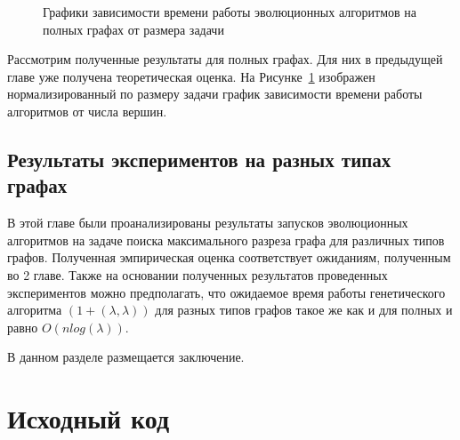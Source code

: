 \documentclass[times]{itmo-student-thesis}
\newcommand{\alglambda}{${(1 + (\lambda , \lambda))}$\xspace}
\newcommand{\ollga}{${(1 + (\lambda , \lambda))}$-ГА\xspace}
\begin{document}
\begin{figure}[t!]
\caption{Графики зависимости времени работы эволюционных алгоритмов на полных графах от размера задачи}
\label{fig:knnorm}
\end{figure}

Рассмотрим полученные результаты для полных графах.
Для них в предыдущей главе уже получена теоретическая оценка.
На Рисунке~\ref{fig:knnorm} изображен нормализированный по размеру задачи график зависимости времени работы алгоритмов от числа вершин.

\section{Результаты экспериментов на разных типах графах}

\chapterconclusion
В этой главе были проанализированы результаты запусков эволюционных алгоритмов на задаче поиска максимального разреза графа для различных типов графов. Полученная эмпирическая оценка соответствует ожиданиям, полученным во 2 главе.
Также на основании полученных результатов проведенных экспериментов можно предполагать, что ожидаемое время работы генетического алгоритма \alglambda для разных типов графов такое же как и для полных и равно $O(nlog(\lambda))$.

\finishrelatedwork

\startconclusionpage

В данном разделе размещается заключение.

\printmainbibliography

\appendix

\chapter{Исходный код}\label{sec:app:1}

\begin{lstlisting}[caption={Реализация \ollga со сбором статистики},label={ollgaStat}]

\end{lstlisting}
\end{document}
